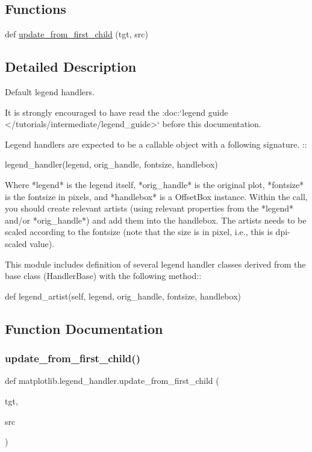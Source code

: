\subsection*{Functions}
\begin{DoxyCompactItemize}
\item 
def \hyperlink{namespacematplotlib_1_1legend__handler_a51637617e81f9b449cfb5cda8a54a5c8}{update\+\_\+from\+\_\+first\+\_\+child} (tgt, src)
\end{DoxyCompactItemize}


\subsection{Detailed Description}
\begin{DoxyVerb}Default legend handlers.

It is strongly encouraged to have read the :doc:`legend guide
</tutorials/intermediate/legend_guide>` before this documentation.

Legend handlers are expected to be a callable object with a following
signature. ::

    legend_handler(legend, orig_handle, fontsize, handlebox)

Where *legend* is the legend itself, *orig_handle* is the original
plot, *fontsize* is the fontsize in pixels, and *handlebox* is a
OffsetBox instance. Within the call, you should create relevant
artists (using relevant properties from the *legend* and/or
*orig_handle*) and add them into the handlebox. The artists needs to
be scaled according to the fontsize (note that the size is in pixel,
i.e., this is dpi-scaled value).

This module includes definition of several legend handler classes
derived from the base class (HandlerBase) with the following method::

    def legend_artist(self, legend, orig_handle, fontsize, handlebox)
\end{DoxyVerb}
 

\subsection{Function Documentation}
\mbox{\label{namespacematplotlib_1_1legend__handler_a51637617e81f9b449cfb5cda8a54a5c8}} 
\subsubsection{\texorpdfstring{update\+\_\+from\+\_\+first\+\_\+child()}{update\_from\_first\_child()}}
{\footnotesize\ttfamily def matplotlib.\+legend\+\_\+handler.\+update\+\_\+from\+\_\+first\+\_\+child (\begin{DoxyParamCaption}\item[{}]{tgt,  }\item[{}]{src }\end{DoxyParamCaption})}

